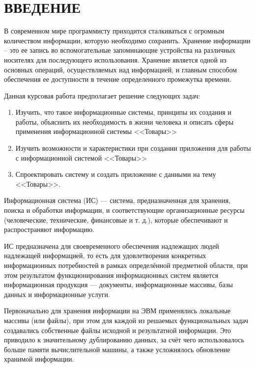 \section*{ВВЕДЕНИЕ} %
{} %

В современном мире программисту приходится сталкиваться с огромным количеством информации, которую необходимо сохранить. Хранение информации – это ее запись во вспомогательные запоминающие устройства на различных носителях для последующего использования. Хранение является одной из основных операций, осуществляемых над информацией, и главным способом обеспечения ее доступности в течение определенного промежутка времени.

Данная курсовая работа предполагает решение следующих задач:

\begin{enumerate}
    \item Изучить, что такое информационные системы, принципы их создания и работы, объяснить их необходимость в жизни человека и описать сферы применения информационной системы <<Товары>>
    \item Изучить возможности и характеристики при создании приложения для работы с информационной системой <<Товары>>
    \item Спроектировать систему и создать приложение с данными на тему <<Товары>>.
\end{enumerate}

Информационная система (ИС) — система, предназначенная для хранения, поиска и обработки информации, и соответствующие организационные ресурсы (человеческие, технические, финансовые и т. д.), которые обеспечивают и распространяют информацию.

ИС предназначена для своевременного обеспечения надлежащих людей надлежащей информацией, то есть для удовлетворения конкретных информационных потребностей в рамках определённой предметной области, при этом результатом функционирования информационных систем является информационная продукция — документы, информационные массивы, базы данных и информационные услуги.

Первоначально для хранения информации на ЭВМ применялись локальные массивы (или файлы), при этом для каждой из решаемых функциональных задач создавались собственные файлы исходной и результатной информации. Это приводило к значительному дублированию данных, за счёт чего использовалось больше памяти вычислительной машины, а также усложнялось обновление хранимой информации.

